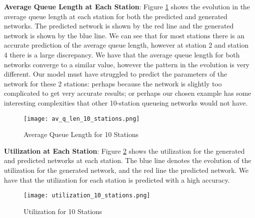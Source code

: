 \documentclass[a4paper,11pt,titlepage]{article}
\begin{document}
\textbf{Average Queue Length at Each Station}: Figure \ref{fig:av_q_len_10_stations} shows the evolution in the average queue length at each station for both the predicted and generated networks. The predicted network is shown by the red line and the generated network is shown by the blue line. We can see that for most stations there is an accurate prediction of the average queue length, however at station 2 and station 4 there is a large discrepancy. We have that the average queue length for both networks converge to a similar value, however the pattern in the evolution is very different. Our model must have struggled to predict the parameters of the network for these 2 stations: perhaps because the network is slightly too complicated to get very accurate results; or perhaps our chosen example has some interesting complexities that other 10-station queueing networks would not have. \\ 

\begin{figure}[h!]
\begin{center}
\texttt{[image: av\_q\_len\_10\_stations.png]}
\caption{Average Queue Length for 10 Stations}
\label{fig:av_q_len_10_stations}
\end{center}
\end{figure}

\textbf{Utilization at Each Station}: Figure \ref{fig:utilization_10_stations} shows the utilization for the generated and predicted networks at each station. The blue line denotes the evolution of the utilization for the generated network, and the red line the predicted network. We have that the utilization for each station is predicted with a high accuracy. \\

\begin{figure}[h!]
\begin{center}
\texttt{[image: utilization\_10\_stations.png]}
\caption{Utilization for 10 Stations}
\label{fig:utilization_10_stations}
\end{center}
\end{figure}
\end{document}
